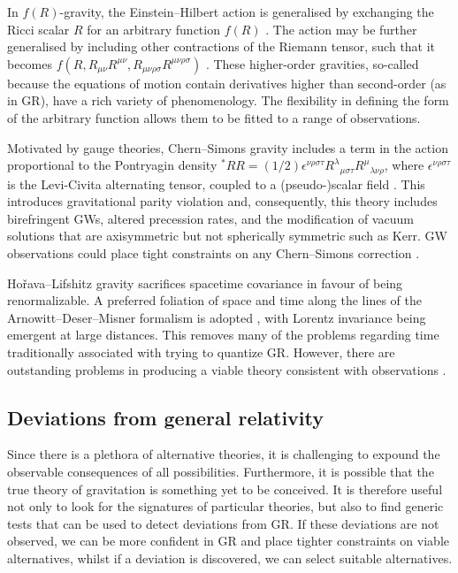 In $f(R)$-gravity, the Einstein--Hilbert action is generalised by exchanging the Ricci scalar $R$ for an arbitrary function $f(R)$ \citep{Buchdahl1970, Sotiriou2010, DeFelice2010}. The action may be further generalised by including other contractions of the Riemann tensor, such that it becomes $f(R, R_{\mu\nu}R^{\mu\nu}, R_{\mu\nu\rho\sigma}R^{\mu\nu\rho\sigma})$ \citep{Madsen1989, Farhoudi2006, Nojiri2011}. These higher-order gravities, so-called because the equations of motion contain derivatives higher than second-order (as in GR), have a rich variety of phenomenology. The flexibility in defining the form of the arbitrary function allows them to be fitted to a range of observations.

Motivated by gauge theories, Chern--Simons gravity includes a term in the action proportional to the Pontryagin density ${^\ast R} R = (1/2)\epsilon^{\nu\rho\sigma\tau}{R^\lambda}_{\mu\sigma\tau}{R^\mu}_{\lambda\nu\rho}$, where $\epsilon^{\nu\rho\sigma\tau}$ is the Levi-Civita alternating tensor, coupled to a (pseudo-)scalar field \citep{Jackiw2003, Smith2008, Alexander2009a}. This introduces gravitational parity violation and, consequently, this theory includes birefringent GWs, altered precession rates, and the modification of vacuum solutions that are axisymmetric but not spherically symmetric such as Kerr. GW observations could place tight constraints on any Chern--Simons correction \citep{Canizares2012}.

Ho\v{r}ava--Lifshitz gravity \citep{Horava2009, Sotiriou2009c, Blas2010a} sacrifices spacetime covariance in favour of being renormalizable. A preferred foliation of space and time along the lines of the Arnowitt--Deser--Misner formalism is adopted \citep{Arnowitt1962a}, with Lorentz invariance being emergent at large distances. This removes many of the problems regarding time traditionally associated with trying to quantize GR. However, there are outstanding problems in producing a viable theory consistent with observations \citep{Sotiriou2010a}.

\subsection{Deviations from general relativity}

Since there is a plethora of alternative theories, it is challenging to expound the observable consequences of all possibilities. Furthermore, it is possible that the true theory of gravitation is something yet to be conceived. It is therefore useful not only to look for the signatures of particular theories, but also to find generic tests that can be used to detect deviations from GR. If these deviations are not observed, we can be more confident in GR and place tighter constraints on viable alternatives, whilst if a deviation is discovered, we can select suitable alternatives.


